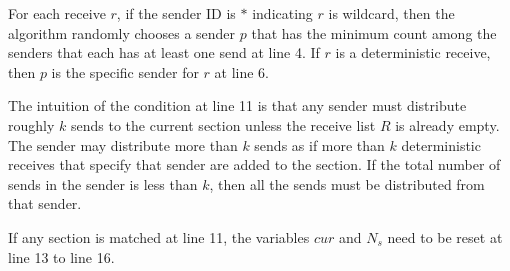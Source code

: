 For each receive $r$, if the sender ID is $\ast$ indicating $r$ is wildcard, then the algorithm randomly chooses a sender $p$ that has the minimum count among the senders that each has at least one send at line 4. If $r$ is a deterministic receive, then $p$ is the specific sender for $r$ at line 6.

The intuition of the condition at line 11 is that any sender must distribute roughly $k$ sends to the current section unless the receive list $R$ is already empty. The sender may distribute more than $k$ sends as if more than $k$ deterministic receives that specify that sender are added to the section. If the total number of sends in the sender is less than $k$, then all the sends must be distributed from that sender.  

If any section is matched at line 11, the variables $\mathit{cur}$ and $N_s$ need to be reset at line 13 to line 16. 


 

